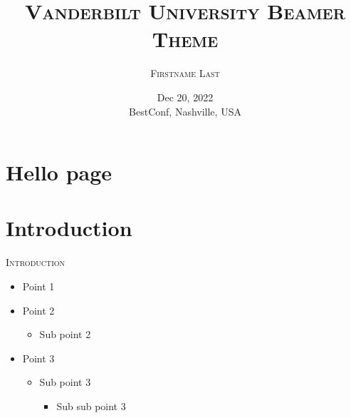 \documentclass[xcolor=dvipsnames]{beamer}
\title[Vandy Theme]{\textsc{Vanderbilt University Beamer Theme}}
\author 
{\textsc{Firstname Last}
}
\institute %
{
	\textsc{Vanderbilt University, Nashville, USA}
}
\date[BestConf 2022] %
{Dec 20, 2022\\         %
BestConf, Nashville, USA} %
\begin{document}
	{	
	
	\section{Hello page}
	\begin{frame}
		\vspace{10mm}
		\titlepage
	\end{frame}
	}
	\addtocounter{framenumber}{-1}


	\section{Introduction}
	\begin{frame}{\textsc{Introduction}}
		\begin{itemize}
			\item Point 1
			\item Point 2
			\begin{itemize}
				\item Sub point 2
			\end{itemize}
			\item Point 3
			\begin{itemize}
				\item Sub point 3
				\begin{itemize}
					\item Sub sub point 3
				\end{itemize}
			\end{itemize}
		\end{itemize}
	\end{frame}
\end{document}
